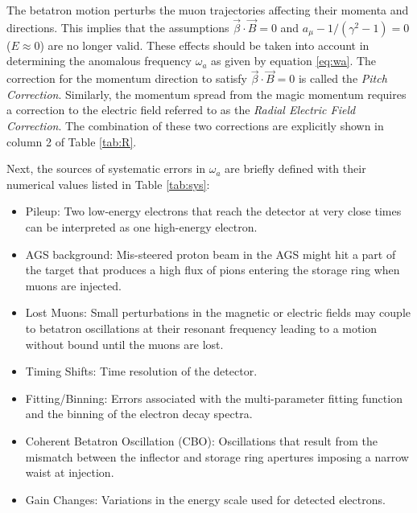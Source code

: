 \documentclass{outhesis}
\begin{document}
The betatron motion perturbs the muon trajectories affecting their momenta and directions. This implies that the assumptions $\overrightarrow{\beta} \cdot \overrightarrow{B} = 0$ and $a_{\mu} -1/\left(\gamma^2-1\right) = 0$ ($E \approx 0$) are no longer valid. These effects should be taken into account in determining the anomalous frequency $\omega_a$ as given by equation \ref{eq:wa}. The correction for the momentum direction to satisfy $\overrightarrow{\beta} \cdot \overrightarrow{B} = 0$ is called the \emph{Pitch Correction}. Similarly, the momentum spread from the magic momentum requires a correction to the electric field referred to as the \emph{Radial Electric Field Correction}. The combination of these two corrections are explicitly shown in column 2 of Table \ref{tab:R}. 

Next, the sources of systematic errors in $\omega_a$ are briefly defined with their numerical values listed in Table \ref{tab:sys}:
\begin{itemize}
\item Pileup: Two low-energy electrons that reach the detector at very close times can be interpreted as one high-energy electron.        
\item AGS background: Mis-steered proton beam in the AGS might hit a part of the target that produces a high flux of pions entering the storage ring when muons are injected. %
\item Lost Muons: Small perturbations in the magnetic or electric fields may couple to betatron oscillations at their resonant frequency leading to a motion without bound until the muons are lost.
\item Timing Shifts: Time resolution of the detector. %
\item Fitting/Binning: Errors associated with the multi-parameter fitting function and the binning of the electron decay spectra. 
\item Coherent Betatron Oscillation (CBO): Oscillations that result from the mismatch between the inflector and storage ring apertures imposing a narrow waist at injection. %
\item Gain Changes: Variations in the energy scale used for detected electrons.
\end{itemize}
\end{document}
